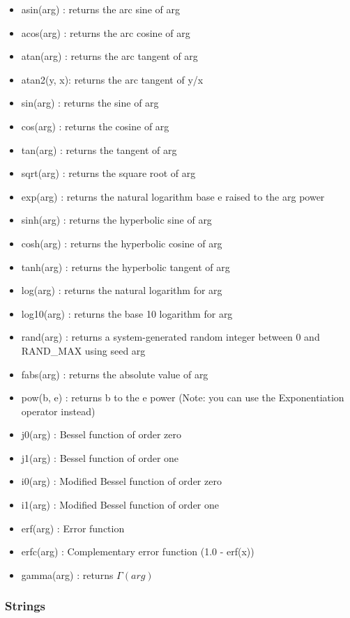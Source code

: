 \begin{itemize}
  \item asin(arg)  : returns the arc sine of arg
  \item acos(arg)  : returns the arc cosine of arg
  \item atan(arg)  : returns the arc tangent of arg
  \item atan2(y, x): returns the arc tangent of y/x
  \item sin(arg)   : returns the sine of arg
  \item cos(arg)   : returns the cosine of arg
  \item tan(arg)   : returns the tangent of arg
  \item sqrt(arg)  : returns the square root of arg
  \item exp(arg)   : returns the natural logarithm base e raised to the arg 
                     power
  \item sinh(arg)  : returns the hyperbolic sine of arg
  \item cosh(arg)  : returns the hyperbolic cosine of arg
  \item tanh(arg)  : returns the hyperbolic tangent of arg
  \item log(arg)   : returns the natural logarithm for arg
  \item log10(arg) : returns the base 10 logarithm for arg
  \item rand(arg)  : returns a system-generated random integer between 0 and RAND\_MAX using seed arg
  \item fabs(arg)  : returns the absolute value of arg
  \item pow(b, e)  : returns b to the e power 
                     (Note: you can use the Exponentiation operator instead)
  \item j0(arg)    : Bessel function of order zero
  \item j1(arg)    : Bessel function of order one
  \item i0(arg)    : Modified Bessel function of order zero
  \item i1(arg)    : Modified Bessel function of order one
  \item erf(arg)   : Error function 
  \item erfc(arg)  : Complementary error function  (1.0 - erf(x))
  \item gamma(arg)  : returns $\Gamma(arg)$
\end{itemize}

\subsubsection{Strings}

